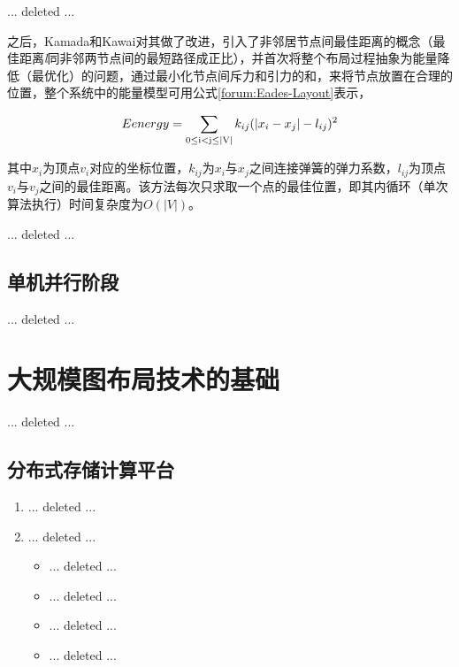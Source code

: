     ... deleted ...

    之后，Kamada和Kawai\citep{kamada1989algorithm}对其做了改进，引入了非邻居节点间最佳距离的概念（最佳距离\emph{l}同非邻两节点间的最短路径成正比），并首次将整个布局过程抽象为能量降低（最优化）的问题，通过最小化节点间斥力和引力的和，来将节点放置在合理的位置，整个系统中的能量模型可用公式\ref{forum:Eades-Layout}表示，

    \begin{equation}\label{forum:Eades-Layout}
    Eenergy = \sum\limits_{0 \le {\rm{i < j}} \le {\rm{|V|}}} {{k_{ij}}} {(|{x_i} - {x_j}| - {l_{ij}})^2}
    \end{equation}

    其中$x_{i}$为顶点$v_{i}$对应的坐标位置，$k_{ij}$为$x_{i}$与$x_{j}$之间连接弹簧的弹力系数，$l_{ij}$为顶点$v_{i}$与$v_{j}$之间的最佳距离。该方法每次只求取一个点的最佳位置，即其内循环（单次算法执行）时间复杂度为$O(|V|)$。


    ... deleted ...


    \subsection{单机并行阶段}\label{A-sec:单机并行阶段}

    ... deleted ...

\section{大规模图布局技术的基础}\label{A-sec:大规模图布局技术的发展}

... deleted ...


    \subsection{分布式存储计算平台}

    \begin{enumerate}
        \item ... deleted ...
        \item ... deleted ...
        \begin{itemize}
            \item ... deleted ...
            \item ... deleted ...
            \item ... deleted ...
            \item ... deleted ...
        \end{itemize}

    \end{enumerate}

